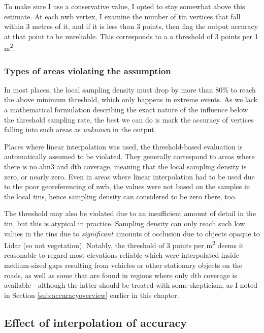 To make sure I use a conservative value, I opted to stay somewhat above this estimate. At each \ac{nwb} vertex, I examine the number of \ac{tin} vertices that fall within 3 metres of it, and if it is less than 3 points, then flag the output accuracy at that point to be unreliable. This corresponds to a a threshold of 3 points per 1 m\textsuperscript{2}.

\subsubsection{Types of areas violating the assumption}

In most places, the local sampling density must drop by more than 80\% to reach the above minimum threshold, which only happens in extreme events. As we lack a mathematical formulation describing the exact nature of the influence below the threshold sampling rate, the best we can do is mark the accuracy of vertices falling into such areas as \textit{unknown} in the output.

Places where linear interpolation was used, the threshold-based evaluation is automatically assumed to be violated. They generally correspond to areas where there is no \ac{ahn3} and \ac{dtb} coverage, meaning that the local sampling density is zero, or nearly zero. Even in areas where linear interpolation had to be used due to the poor georeferencing of \ac{nwb}, the values were not based on the samples in the local \ac{tin}s, hence sampling density can considered to be zero there, too.

The threshold may also be violated due to an insufficient amount of detail in the \ac{tin}, but this is atypical in practice. Sampling density can only reach such low values in the \ac{tin}s due to \textit{significant} amounts of occlusion due to objects opaque to Lidar (so not vegetation). Notably, the threshold of 3 points per m\textsuperscript{2} deems it reasonable to regard most elevations reliable which were interpolated inside medium-sized gaps resulting from vehicles or other stationary objects on the roads, as well as some that are found in regions where only \ac{dtb} coverage is available - although the latter should be treated with some skepticism, as I noted in Section \ref{sub:accuracyoverview} earlier in this chapter.

\subsection{Effect of interpolation of accuracy}
\label{sub:m_accuracyinterpolation}


